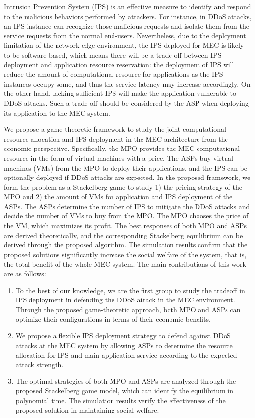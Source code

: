 \documentclass[10pt,journal, compsoc]{IEEEtran}
\begin{document}
Intrusion Prevention System (IPS) is an effective measure to identify and respond to the malicious behaviors performed by attackers\cite{Nadeem}. For instance, in DDoS attacks, an IPS instance can recognize those malicious requests and isolate them from the service requests from the normal end-users\cite{Siregar}. Nevertheless, due to the deployment limitation of the network edge environment, the IPS deployed for MEC is likely to be software-based, which means there will be a trade-off between IPS deployment and application resource reservation: the deployment of IPS will reduce the amount of computational resource for applications as the IPS instances occupy some, and thus the service latency may increase accordingly. On the other hand, lacking sufficient IPS will make the application vulnerable to DDoS attacks. Such a trade-off should be considered by the ASP when deploying its application to the MEC system. 

We propose a game-theoretic framework to study the joint computational resource allocation and IPS deployment in the MEC architecture from the economic perspective. Specifically, the MPO provides the MEC computational resource in the form of virtual machines with a price. The ASPs buy virtual machines (VMs) from the MPO to deploy their applications, and the IPS can be optionally deployed if DDoS attacks are expected. In the proposed framework, we form the problem as a Stackelberg game to study 1) the pricing strategy of the MPO and 2) the amount of VMs for application and IPS deployment of the ASPs. The ASPs determine the number of IPS to mitigate the DDoS attacks and decide the number of VMs to buy from the MPO. The MPO chooses the price of the VM, which maximizes its profit. The best responses of both MPO and ASPs are derived theoretically, and the corresponding Stackelberg equilibrium can be derived through the proposed algorithm. The simulation results confirm that the proposed solutions significantly increase the social welfare of the system, that is, the total benefit of the whole MEC system.
The main contributions of this work are as follows:
\begin{enumerate}
    \item To the best of our knowledge, we are the first group to study the tradeoff in IPS deployment in defending the DDoS attack in the MEC environment. Through the proposed game-theoretic approach, both MPO and ASPs can optimize their configurations in terms of their economic benefits.
    \item We propose a flexible IPS deployment strategy to defend against DDoS attacks at the MEC system by allowing ASPs to determine the resource allocation for IPS and main application service according to the expected attack strength. 
    \item The optimal strategies of both MPO and ASPs are analyzed through the proposed Stackelberg game model, which can identify the equilibrium in polynomial time. The simulation results verify the effectiveness of the proposed solution in maintaining social welfare. 
\end{enumerate}
\end{document}
